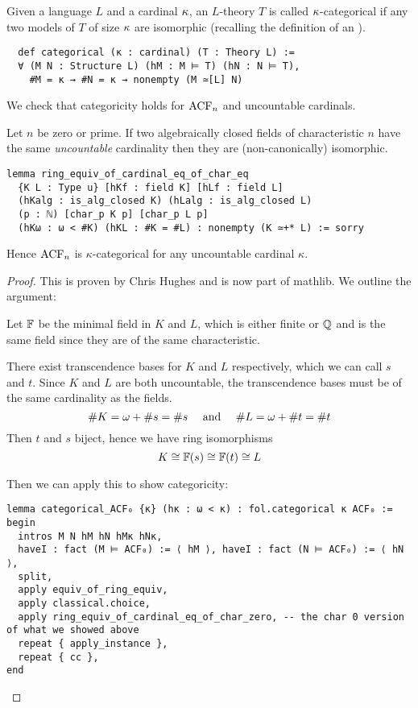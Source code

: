 \begin{dfn}[Categoricity]
    Given a language $L$ and a cardinal $\kappa$,
    an $L$-theory $T$ is called $\kappa$-categorical
    if any two models of $T$ of size $\kappa$ are isomorphic
    (recalling the definition of an
    ).

    \begin{lstlisting}
  def categorical (κ : cardinal) (T : Theory L) :=
  ∀ (M N : Structure L) (hM : M ⊨ T) (hN : N ⊨ T),
    #M = κ → #N = κ → nonempty (M ≃[L] N) \end{lstlisting}
\end{dfn}

We check that categoricity holds for $\operatorname{ACF}_{n}$ and uncountable cardinals.
\begin{prop}
  Let $n$ be zero or prime.
  If two algebraically closed fields of characteristic $n$ have the same \textit{uncountable}
  cardinality then they are (non-canonically) isomorphic.
  \begin{lstlisting}
lemma ring_equiv_of_cardinal_eq_of_char_eq
  {K L : Type u} [hKf : field K] [hLf : field L]
  (hKalg : is_alg_closed K) (hLalg : is_alg_closed L)
  (p : ℕ) [char_p K p] [char_p L p]
  (hKω : ω < #K) (hKL : #K = #L) : nonempty (K ≃+* L) := sorry \end{lstlisting}

  Hence $\operatorname{ACF}_{n}$ is $\kappa$-categorical for any uncountable cardinal $\kappa$.
\end{prop}
\begin{proof}
  This is proven by Chris Hughes and is now part of mathlib.
  We outline the argument:

  Let $\mathbb{F}$ be the minimal field in $K$ and $L$,
  which is either finite or $\mathbb{Q}$
  and is the same field since they are of the same characteristic.

  There exist transcendence bases for $K$ and $L$ respectively,
  which we can call $s$ and $t$.
  Since $K$ and $L$ are both uncountable,
  the transcendence bases must be of the same cardinality as the fields.
  \[ \# K = \omega + \# s = \# s \quad \text{ and }
    \quad \# L = \omega + \# t = \# t \]
  Then $t$ and $s$ biject, hence we have ring isomorphisms
  \[K \cong \mathbb{F}(s) \cong \mathbb{F}(t) \cong L\]

  Then we can apply this to show categoricity:

\begin{lstlisting}
lemma categorical_ACF₀ {κ} (hκ : ω < κ) : fol.categorical κ ACF₀ :=
begin
  intros M N hM hN hMκ hNκ,
  haveI : fact (M ⊨ ACF₀) := ⟨ hM ⟩, haveI : fact (N ⊨ ACF₀) := ⟨ hN ⟩,
  split,
  apply equiv_of_ring_equiv,
  apply classical.choice,
  apply ring_equiv_of_cardinal_eq_of_char_zero, -- the char 0 version of what we showed above
  repeat { apply_instance },
  repeat { cc },
end\end{lstlisting}
\end{proof}

